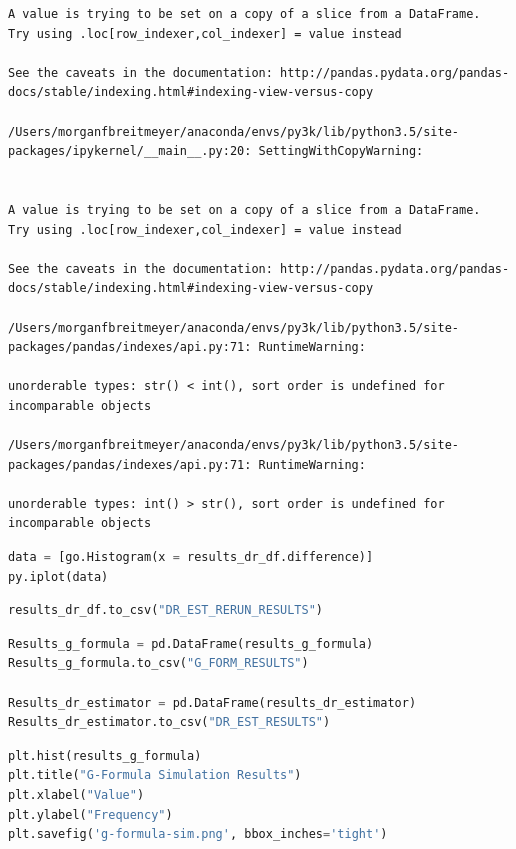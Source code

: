 \begin{lstlisting}
A value is trying to be set on a copy of a slice from a DataFrame.
Try using .loc[row_indexer,col_indexer] = value instead

See the caveats in the documentation: http://pandas.pydata.org/pandas-docs/stable/indexing.html#indexing-view-versus-copy

/Users/morganfbreitmeyer/anaconda/envs/py3k/lib/python3.5/site-packages/ipykernel/__main__.py:20: SettingWithCopyWarning:


A value is trying to be set on a copy of a slice from a DataFrame.
Try using .loc[row_indexer,col_indexer] = value instead

See the caveats in the documentation: http://pandas.pydata.org/pandas-docs/stable/indexing.html#indexing-view-versus-copy

/Users/morganfbreitmeyer/anaconda/envs/py3k/lib/python3.5/site-packages/pandas/indexes/api.py:71: RuntimeWarning:

unorderable types: str() < int(), sort order is undefined for incomparable objects

/Users/morganfbreitmeyer/anaconda/envs/py3k/lib/python3.5/site-packages/pandas/indexes/api.py:71: RuntimeWarning:

unorderable types: int() > str(), sort order is undefined for incomparable objects
\end{lstlisting}

\begin{lstlisting}[language=Python]
data = [go.Histogram(x = results_dr_df.difference)]
py.iplot(data)
\end{lstlisting}

\begin{lstlisting}[language=Python]
results_dr_df.to_csv("DR_EST_RERUN_RESULTS")
\end{lstlisting}

\begin{lstlisting}[language=Python]
Results_g_formula = pd.DataFrame(results_g_formula)
Results_g_formula.to_csv("G_FORM_RESULTS")

Results_dr_estimator = pd.DataFrame(results_dr_estimator)
Results_dr_estimator.to_csv("DR_EST_RESULTS")
\end{lstlisting}

\begin{lstlisting}[language=Python]
%matplotlib inline
plt.hist(results_g_formula)
plt.title("G-Formula Simulation Results")
plt.xlabel("Value")
plt.ylabel("Frequency")
plt.savefig('g-formula-sim.png', bbox_inches='tight')
\end{lstlisting}

